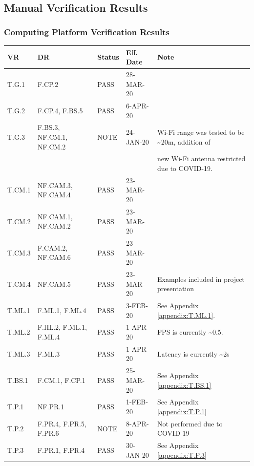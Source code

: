 \documentclass[10pt,letterpaper]{article}
\begin{document}
\subsection{Manual Verification Results}
\subsubsection{Computing Platform Verification Results}
\begin{table}[H]
	\centering
	\begin{tabular}{lllll}
	\hline
	\textbf{VR} & \textbf{DR} & \textbf{Status} & \textbf{Eff. Date} & \textbf{Note}\\
	\hline
	T.G.1 & F.CP.2 & PASS & 28-MAR-20  & \\
	T.G.2 & F.CP.4, F.BS.5 & PASS & 6-APR-20 \\
	T.G.3 & F.BS.3, NF.CM.1, NF.CM.2 & NOTE & 24-JAN-20 & Wi-Fi range was tested to be \textasciitilde 20m, addition of \\ & & & & new Wi-Fi antenna restricted due to COVID-19. \\
	\hline
	T.CM.1 & NF.CAM.3, NF.CAM.4   & PASS   & 23-MAR-20 & \\
	T.CM.2 & NF.CAM.1, NF.CAM.2   & PASS   & 23-MAR-20 &  \\
	T.CM.3 & F.CAM.2, NF.CAM.6   & PASS   & 23-MAR-20 &  \\
	T.CM.4 & NF.CAM.5   & PASS   & 23-MAR-20 & Examples included in project presentation \\
	\hline
	T.ML.1 & F.ML.1, F.ML.4 & PASS & 3-FEB-20 & See Appendix \ref{appendix:T.ML.1}.\\
	T.ML.2 & F.HL.2, F.ML.1, F.ML.4 & PASS  & 1-APR-20 & FPS is currently \textasciitilde 0.5. \\
    T.ML.3 & F.ML.3 & PASS  & 1-APR-20 & Latency is currently \textasciitilde 2s\\
    \hline
    T.BS.1 & F.CM.1, F.CP.1 & PASS & 25-MAR-20 & See Appendix \ref{appendix:T.BS.1} \\
    \hline
    T.P.1 & NF.PR.1 & PASS   & 1-FEB-20 & See Appendix \ref{appendix:T.P.1}\\
    T.P.2 & F.PR.4, F.PR.5, F.PR.6 & NOTE & 8-APR-20 & Not performed due to COVID-19 \\
    T.P.3 & F.PR.1, F.PR.4 & PASS   & 30-JAN-20 & See Appendix \ref{appendix:T.P.3} \\
	\hline
	\end{tabular}
\end{table}
\end{document}
